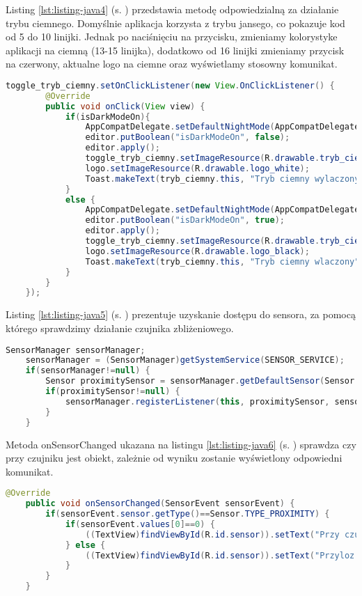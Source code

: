  Listing \ref{lst:listing-java4} (s. \pageref{lst:listing-java4}) przedstawia metodę odpowiedzialną za działanie trybu ciemnego. Domyślnie aplikacja korzysta z trybu jansego, co pokazuje kod od 5 do 10 linijki. Jednak po naciśnięciu na przycisku, zmieniamy kolorystyke aplikacji na ciemną (13-15 linijka), dodatkowo od 16 linijki zmieniamy przycisk na czerwony, aktualne logo na ciemne oraz wyświetlamy stosowny komunikat.
\begin{lstlisting}[caption=Tryb Ciemny - Włączenie/wyłączenie trybu ciemnego, label={lst:listing-java4}, language=Java]
	toggle_tryb_ciemny.setOnClickListener(new View.OnClickListener() {
		@Override
		public void onClick(View view) {
			if(isDarkModeOn){
				AppCompatDelegate.setDefaultNightMode(AppCompatDelegate.MODE_NIGHT_NO);
				editor.putBoolean("isDarkModeOn", false);
				editor.apply();
				toggle_tryb_ciemny.setImageResource(R.drawable.tryb_ciemny_off);
				logo.setImageResource(R.drawable.logo_white);
				Toast.makeText(tryb_ciemny.this, "Tryb ciemny wylaczony", Toast.LENGTH_SHORT).show();
			}
			else {
				AppCompatDelegate.setDefaultNightMode(AppCompatDelegate.MODE_NIGHT_YES);
				editor.putBoolean("isDarkModeOn", true);
				editor.apply();
				toggle_tryb_ciemny.setImageResource(R.drawable.tryb_ciemny_on);
				logo.setImageResource(R.drawable.logo_black);
				Toast.makeText(tryb_ciemny.this, "Tryb ciemny wlaczony", Toast.LENGTH_SHORT).show();
			}
		}
	});
\end{lstlisting}

\newpage


Listing \ref{lst:listing-java5} (s. \pageref{lst:listing-java5}) prezentuje uzyskanie dostępu do sensora, za pomocą którego sprawdzimy działanie czujnika zbliżeniowego.
\begin{lstlisting}[caption=Czujnik Zbliżeniowy - Dostęp do czujnika, label={lst:listing-java5}, language=Java]
	SensorManager sensorManager;
	sensorManager = (SensorManager)getSystemService(SENSOR_SERVICE);
	if(sensorManager!=null) {
		Sensor proximitySensor = sensorManager.getDefaultSensor(Sensor.TYPE_PROXIMITY);
		if(proximitySensor!=null) {
			sensorManager.registerListener(this, proximitySensor, sensorManager.SENSOR_DELAY_NORMAL);
		}
	}
\end{lstlisting}


Metoda onSensorChanged ukazana na listingu \ref{lst:listing-java6} (s. \pageref{lst:listing-java6}) sprawdza czy przy czujniku jest obiekt, zależnie od wyniku zostanie wyświetlony odpowiedni komunikat.
\begin{lstlisting}[caption=Czujnik Zbliżeniowy - Działanie, label={lst:listing-java6}, language=Java]
	@Override
	public void onSensorChanged(SensorEvent sensorEvent) {
		if(sensorEvent.sensor.getType()==Sensor.TYPE_PROXIMITY) {
			if(sensorEvent.values[0]==0) {
				((TextView)findViewById(R.id.sensor)).setText("Przy czujniku jest obiekt");
			} else {
				((TextView)findViewById(R.id.sensor)).setText("Przyloz obiekt do czujnika");
			}
		}
	}
\end{lstlisting}


